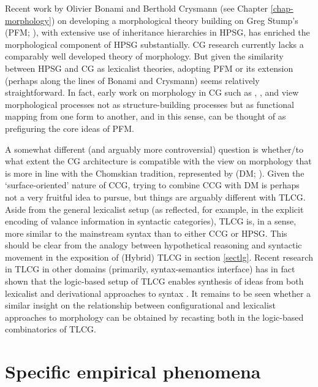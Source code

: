 \documentclass[output=paper]{langsci/langscibook}
\begin{document}
Recent work by Olivier Bonami and Berthold Crysmann
(see Chapter \ref{chap-morphology}) on
developing a morphological theory building on 
Greg Stump's  (PFM; \citet{Stump2001a-u-kopiert}),
with extensive use of inheritance hierarchies in HPSG, 
has enriched the morphological component of HPSG substantially.
CG research currently lacks a comparably well developed theory of
morphology. But given the similarity between HPSG and CG as lexicalist
theories, adopting PFM or its extension (perhaps along the lines of
Bonami and Crysmann) seems relatively straightforward. In fact, early
work on morphology in CG such as
\citet{hoeksema-diss}, \citet{moortgat84}, \citet{hoeksemajanda88}
and \citet{raffelsiefen92} view morphological processes not as
structure-building processes but as functional mapping from one form
to another, and in this sense, can be thought of as prefiguring the
core ideas of PFM.

A somewhat different (and arguably more controversial) question is
whether/to what extent the CG architecture is compatible with the view
on morphology that is more in line with the Chomskian tradition,
represented by  (DM;
\citet{HalleMarantz93}). Given the `surface-oriented' nature of CCG,
trying to combine CCG with DM is perhaps not a very fruitful idea to
pursue, but things are arguably different with TLCG. Aside from the
general lexicalist setup (as reflected, for example, in the explicit
encoding of valance information in syntactic categories), TLCG is, in
a sense, more similar to the mainstream syntax than to either CCG or
HPSG. This should be clear from the analogy between hypothetical
reasoning and syntactic movement in the exposition of (Hybrid) TLCG in
section \ref{sectlg}. Recent research in TLCG in other domains
(primarily, syntax-semantics interface) has in fact shown that the logic-based
setup of TLCG enables synthesis of ideas from both lexicalist and
derivational approaches to syntax
\citep{Kubota2014a-u,kubota-levine-gapping,kubota-levine-resp,kubota-levine-modal-wollic}.
It remains to be seen whether a similar insight on the relationship
between configurational and lexicalist approaches to morphology can be
obtained by recasting both in the logic-based combinatorics of TLCG.



\section{Specific empirical phenomena}
\end{document}
